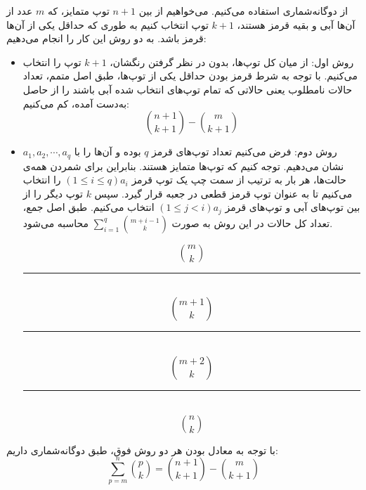 \p		
از دوگانه‌شماری استفاده می‌کنیم. می‌خواهیم از بین
$n + 1$
توپ متمایز، که 
$m$
عدد از آن‌ها آبی و بقیه قرمز هستند، 
$k + 1$
توپ انتخاب کنیم به طوری که حداقل یکی از آن‌ها قرمز باشد. به دو روش این کار را انجام می‌دهیم:
\begin{itemize}
\item
روش اول: 
از میان کل توپ‌ها، بدون در نظر گرفتن رنگشان،
 $k + 1$
توپ را انتخاب می‌کنیم. با توجه به شرط قرمز بودن حداقل یکی از توپ‌ها، طبق اصل متمم، تعداد حالات نامطلوب یعنی حالاتی که تمام توپ‌های انتخاب شده آبی باشند را از حاصل به‌دست آمده، کم می‌کنیم:
$$\binom{n + 1}{k + 1} - \binom{m}{k + 1}$$
\item 
روش دوم:
فرض می‌کنیم تعداد توپ‌های قرمز
$q$
بوده و آن‌ها را با
$a_1, a_2, \cdots, a_q$
نشان می‌دهیم. 
توجه کنیم که توپ‌ها متمایز هستند. بنابراین برای شمردن همه‌ی حالت‌ها، هر بار به ترتیب از سمت چپ یک توپ قرمز 
$(1\leq i\leq q) a_i$
 را انتخاب می‌کنیم تا به عنوان توپ قرمز قطعی در جعبه قرار گیرد.
سپس 
 $k$
 توپ دیگر را از بین توپ‌های آبی و توپ‌های قرمز 
 $(1\leq j<i) a_j$
  انتخاب می‌کنیم.
طبق اصل جمع، تعداد کل حالات در این روش به صورت
 $\sum\limits_{i=1}^{q}\binom{m+i-1}{k}$
محاسبه می‌شود.

\p
{}
$$\binom{m}{k}$$
\hrule
\p
\\
 $$\binom{m + 1}{k}$$
 \hrule
\p
\\
  $$\binom{m + 2}{k}$$
  \hrule
 \p
 \\
 $$\binom{n}{k}$$

\end{itemize}
با ‌توجه به معادل بودن هر دو روش فوق، طبق دوگانه‌شماری داریم:
$$\sum\limits_{p=m}^{n}\binom{p}{k} = \binom{n + 1}{k + 1} - \binom{m}{k + 1}$$